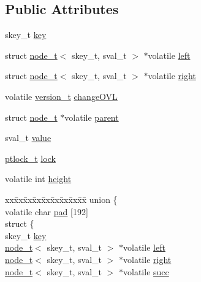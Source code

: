 \subsection*{Public Attributes}
\begin{DoxyCompactItemize}
\item 
skey\+\_\+t \hyperlink{structnode__t_ad38b63280bb7c69e5991653ce673dc35}{key}
\item 
struct \hyperlink{structnode__t}{node\+\_\+t}$<$ skey\+\_\+t, sval\+\_\+t $>$ $\ast$volatile \hyperlink{structnode__t_a3dcf556399e1c75d881c2d700634fda0}{left}
\item 
struct \hyperlink{structnode__t}{node\+\_\+t}$<$ skey\+\_\+t, sval\+\_\+t $>$ $\ast$volatile \hyperlink{structnode__t_ae2a246fc0c98ee4bec4e69cad2f4ba3c}{right}
\item 
volatile \hyperlink{ccavl__impl_8h_ad18cce847aba06882c0ceedf7c5b32dc}{version\+\_\+t} \hyperlink{structnode__t_a04ef1d059a1c38a7941eecd535f32d05}{change\+O\+VL}
\item 
struct \hyperlink{structnode__t}{node\+\_\+t} $\ast$volatile \hyperlink{structnode__t_a36d0dc0f90d0d93c475ef32b6f2b4cfd}{parent}
\item 
sval\+\_\+t \hyperlink{structnode__t_afa5c26cdc749c26fcbc550baf6e97717}{value}
\item 
\hyperlink{ccavl__impl_8h_a61cf36cb33c84af9c784f95686701a94}{ptlock\+\_\+t} \hyperlink{structnode__t_a9efe5c548c28ff5d1cddfde25bac62be}{lock}
\item 
volatile int \hyperlink{structnode__t_a2399b4339a7c3ea7b7ffaa913680580a}{height}
\item 
\begin{tabbing}
xx\=xx\=xx\=xx\=xx\=xx\=xx\=xx\=xx\=\kill
union \{\\
\>volatile char \hyperlink{structnode__t_aa47c298fa082c9997590c3fdb05b796a}{pad} \mbox{[}192\mbox{]}\\
\>struct \{\\
\>\>skey\_t \hyperlink{structnode__t_ad38b63280bb7c69e5991653ce673dc35}{key}\\
\>\>\hyperlink{structnode__t}{node\_t}$<$ skey\_t, sval\_t $>$ $\ast$volatile \hyperlink{structnode__t_a6f9a1ea968cdda781d9d4f9ea65c5856}{left}\\
\>\>\hyperlink{structnode__t}{node\_t}$<$ skey\_t, sval\_t $>$ $\ast$volatile \hyperlink{structnode__t_a42cf1a237abbb7d2fcfe9d6536fddc97}{right}\\
\>\>\hyperlink{structnode__t}{node\_t}$<$ skey\_t, sval\_t $>$ $\ast$volatile \hyperlink{structnode__t_aad0b9c0571665e0a5811f9f3d683b76e}{succ}\\

\end{tabbing}
\end{DoxyCompactItemize}
